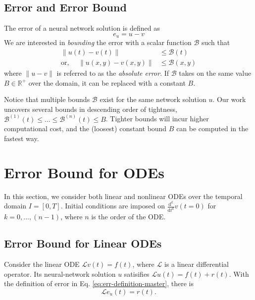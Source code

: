 \documentclass[accepted]{uai2023}
\newcommand{\Err}{e}
\newcommand{\Bound}{\mathcal{B}}
\renewcommand{\L}{\mathcal{L}}
\begin{document}
\subsection{Error and Error Bound}
    The error of a neural network solution is defined as 
    {
        \small
        \begin{equation}\label{eq:err-definition-master}
            \Err_u= u - v
        \end{equation}
    }
    We are interested in \textit{bounding} the error with a scalar function $\Bound$ such that
    {
        \small
        \begin{align}
            \|u(t) - v(t)\| &\leq \Bound(t) \\
            \text{or, } \quad \|u(x, y) - v(x, y)\| &\leq \Bound(x, y)
        \end{align}
    }
    where $\|u - v\|$ is referred to as the \textit{absolute error}.
    If $\Bound$ takes on the same value $B \in \mathbb{R}^{+}$ over the domain, it can be replaced with a constant $B$.

    Notice that multiple bounds $\Bound$ exist for the same network solution $u$.
    Our work uncovers several bounds in descending order of tightness, $\Bound^{(1)}(t) \leq \dots \leq \Bound^{(n)}(t) \leq B$. Tighter bounds will incur higher computational cost, and the (loosest) constant bound $B$ can be computed in the fastest way.


\section{Error Bound for ODEs}
    In this section, we consider both linear and nonlinear ODEs over the temporal domain $I=[0, T]$. 
    Initial conditions are imposed on $\frac{\mathrm{d}^k}{\mathrm{d}t^k}v(t=0)$ for $k = 0, \dots, (n - 1)$, where $n$ is the order of the ODE.

\subsection{Error Bound for Linear ODEs}\label{section:error-bound-for-linear-odes}
    Consider the linear ODE $\L v(t) = f(t)$, where $\L$ is a linear differential operator. 
    Its neural-network solution $u$ satisifies $\L u(t) = f(t) + r(t)$. 
    With the definition of error in Eq. \ref{eq:err-definition-master}, there is
    {   
        \small
        \begin{equation} \label{eq:linear-error-master}
            \L \Err_u(t) = r(t).
        \end{equation}
    }
\end{document}
